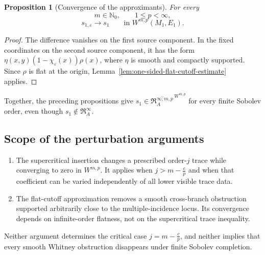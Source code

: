 \documentclass[11pt]{article}
\theoremstyle{plain}
\newtheorem{proposition}[theorem]{Proposition}
\theoremstyle{definition}
\begin{document}
\begin{proposition}[Convergence of the approximants]
\label{prop:convergence-exponential-approximants}
For every
\[
  m\in\mathbb N_0,
  \qquad
  1\leq p<\infty,
\]
\[
  \boxed{
  s_{1,\varepsilon}
  \longrightarrow
  s_1
  \qquad
  \text{in }W^{m,p}(M_1,E_1).
  }
\]
\end{proposition}

\begin{proof}
The difference vanishes on the first source component. In the fixed
coordinates on the second source component, it has the form
\(\eta(x,y) \left( 1-\chi_\varepsilon(x) \right) \rho(x)\),
where \(\eta\) is smooth and compactly supported. Since \(\rho\) is
flat at the origin,
Lemma~\ref{lem:one-sided-flat-cutoff-estimate}
applies.
\end{proof}

Together, the preceding propositions give \(s_1 \in \overline{ \mathfrak R_A^{\infty;m,p} }^{\,W^{m,p}}\) for every finite Sobolev order, even though
\(s_1\notin\mathfrak R_A^\infty\).

\subsection{Scope of the perturbation arguments}
\label{appsubsec:perturbation-scope}



\begin{enumerate}[label=\textup{(\roman*)}]
  \item The supercritical insertion changes a prescribed
        order-\(j\) trace while converging to zero in \(W^{m,p}\). It
        applies when \(j>m-\frac{c}{p}\)         and when that coefficient can be varied independently of all
        lower visible trace data.

  \item The flat-cutoff approximation removes a smooth cross-branch
        obstruction supported arbitrarily close to the
        multiple-incidence locus. Its convergence depends on
        infinite-order flatness, not on the supercritical trace
        inequality.
\end{enumerate}

Neither argument determines the critical case
\(j=m-\frac{c}{p}\),
and neither implies that every smooth Whitney obstruction disappears
under finite Sobolev completion.



\end{document}
